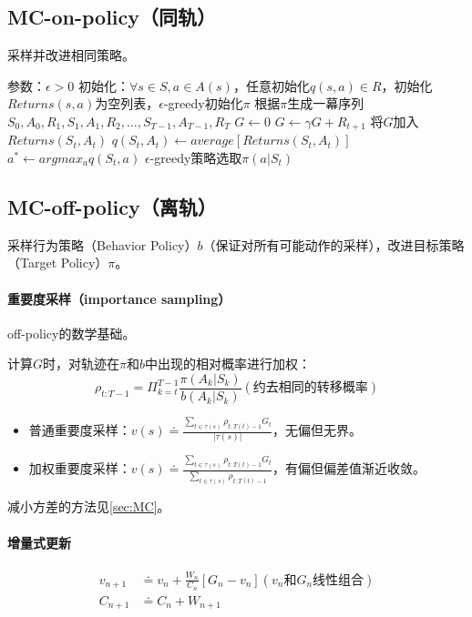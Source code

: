 \documentclass[
12pt, %
a4paper, 
oneside, %
headinclude,footinclude, %
]{scrartcl}
\begin{document}
\subsection[MC-on-policy]{MC-on-policy（同轨）}
采样并改进相同策略。
\begin{myalgorithm}
\State 参数：$ \epsilon > 0 $
\State 初始化：$ \forall s \in S, a \in A(s) $，任意初始化$ q(s, a) \in R $，初始化$ Returns(s, a) $为空列表，$ \epsilon $-greedy初始化$ \pi $
\Loop
\State 根据$ \pi $生成一幕序列$ S_0, A_0, R_1, S_1, A_1, R_2, \dots, S_{T - 1}, A_{T - 1}, R_T $
\State $ G \gets 0 $
\State $ G \gets \gamma G + R_{t + 1} $
 
\State 将$ G $加入$ Returns(S_t,A_t) $
\State $ q(S_t, A_t) \gets average[Returns(S_t, A_t)] $
\State $ a^* \gets argmax_a q(S_t, a) $
\State $ \epsilon $-greedy策略选取$ \pi(a|S_t) $
\EndIf
\EndFor
\EndLoop
\end{myalgorithm}
\subsection[MC-off-policy]{MC-off-policy（离轨）}
采样行为策略（Behavior Policy）$ b $（保证对所有可能动作的采样），改进目标策略（Target Policy）$ \pi $。
\paragraph{重要度采样（importance sampling）}\label{sec:MC back}
off-policy的数学基础。

计算$ G $时，对轨迹在$ \pi $和$ b $中出现的相对概率进行加权：
$$ \rho_{t:T - 1} = \Pi_{k = t}^{T - 1} \frac{\pi(A_k|S_k)}{b(A_k|S_k)} (\text{约去相同的转移概率}) $$
\begin{itemize}
\item 普通重要度采样：$ v(s) \doteq \frac{\sum_{t \in \tau(s)} \rho_{t:T(t) - 1}G_t}{|\tau(s)|} $，无偏但无界。
\item 加权重要度采样：$ v(s) \doteq \frac{\sum_{t \in \tau(s)} \rho_{t:T(t) - 1}G_t}{\sum_{t \in \tau(s)} \rho_{t:T(t) - 1}} $，有偏但偏差值渐近收敛。
\end{itemize}

减小方差的方法见\ref{sec:MC}。
\paragraph{增量式更新}
\begin{align*}
v_{n + 1} &\doteq v_n + \frac{W_n}{C_n}[G_n - v_n] (v_n \text{和} G_n \text{线性组合}) \\
C_{n + 1} &\doteq C_n + W_{n + 1}
\end{align*}
\end{document}
